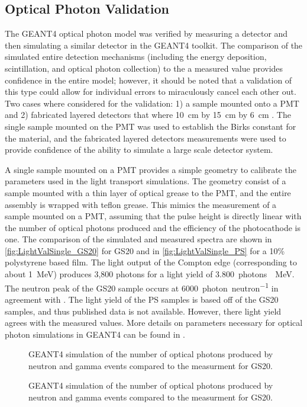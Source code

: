 \subsection{Optical Photon Validation}
\label{sec:OpticalPhotonValidation}
The GEANT4 optical photon model was verified by measuring a detector and then simulating a similar detector in the GEANT4 toolkit. 
The comparison of the simulated entire  detection mechanisms (including the energy deposition, scintillation, and optical photon collection) to the a measured value provides confidence in the entire model; however, it should be noted that a validation of this type could allow for individual errors to miraculously cancel each other out.
Two cases where considered for the validation: 1) a sample mounted onto a PMT and 2) fabricated layered detectors that where  \SI{10}{cm} by \SI{15}{cm} by \SI{6}{cm} .
The single sample mounted on the PMT was used to establish the Birks constant for the material, and the fabricated layered detectors measurements were used to provide confidence of the ability to simulate a large scale detector system.

A single sample mounted on a PMT provides a simple geometry to calibrate the parameters used in the light transport simulations. 
The geometry consist of a sample mounted with a thin layer of optical grease to the PMT, and the entire assembly is wrapped with teflon grease.
This mimics the measurement of a sample mounted on a PMT, assuming that the pulse height is directly linear with the number of optical photons produced and the efficiency of the photocathode is one.
The comparison of the simulated and measured spectra are shown in \autoref{fig:LightValSingle_GS20} for GS20 and in \autoref{fig:LightValSingle_PS} for a 10\% polystyrene based film.
The light output of the Compton edge (corresponding to about \SI{1}{\MeV}) produces 3,800 photons for a light yield of \SI{3,800}{photons \per \MeV}. 
The neutron peak of the GS20 sample occurs at \SI{6000}{photon\per neutron} in agreement with \cite{carel_w.e_inorganic-scintillator_2001}.
The light yield of the PS samples is based off of the GS20 samples, and thus published data is not available.
However, there light yield agrees with the measured values.
More details on parameters necessary for optical photon simulations in GEANT4 can be found in \label{chap:G4Intro}.
\begin{figure}
	\caption[Simulated Photons and Pulse Height for GS20]{GEANT4 simulation of the number of optical photons produced by neutron and gamma events compared  to the measurment for GS20.}
	\label{fig:LightValSingle_GS20}
\end{figure}
\begin{figure}
	\caption[Simulated Photons and Pulse Height for GS20]{GEANT4 simulation of the number of optical photons produced by neutron and gamma events compared  to the measurment for GS20.}
	\label{fig:LightValSingle_GS20}
\end{figure}


